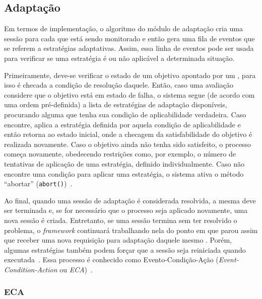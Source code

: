 \subsection{Adaptação}
\label{sec-referencial-zanshin-adaptacao}
Em termos de implementação, o algoritmo do módulo de adaptação cria uma sessão para cada \awreq que está sendo monitorado e então gera uma fila de eventos que se referem a estratégias adaptativas. Assim, essa linha de eventos pode ser usada para verificar se uma estratégia é ou não aplicável a determinada situação. 

Primeiramente, deve-se verificar o estado de um objetivo apontado por um \awreq, para isso é checada a condição de resolução daquele. Então, caso uma avaliação considere que o objetivo está em estado de falha, o sistema segue (de acordo com uma ordem pré-definida) a lista de estratégias de adaptação disponíveis, procurando alguma que tenha sua condição de aplicabilidade verdadeira. Caso encontre, aplica a estratégia definida por aquela condição de aplicabilidade e então retorna ao estado inicial, onde a checagem da satisfabilidade do objetivo é realizada novamente. Caso o objetivo ainda não tenha sido satisfeito, o processo começa novamente, obedecendo restrições como, por exemplo, o número de tentativas de aplicação de uma estratégia, definido individualmente. Caso não encontre uma condição para aplicar uma estratégia, o sistema ativa o método ``abortar'' (\texttt{abort()})~\cite{souza2013requirements}. 

Ao final, quando uma sessão de adaptação é considerada resolvida, a mesma deve ser terminada e, se for necessário que o processo seja aplicado novamente, uma nova sessão é criada. Entretanto, se uma sessão termina sem ter resolvido o problema, o \textit{framework} continuará trabalhando nela do ponto em que parou assim que receber uma nova requisição para adaptação daquele mesmo \awreq. Porém, algumas estratégias também podem forçar que a sessão seja reiniciada quando executada~\cite{souza2013requirements}. Essa processo é conhecido como Evento-Condição-Ação (\textit{Event-Condition-Action} ou \textit{ECA})~\cite{morin2009models}.

\subsubsection{ECA}
\label{sec-referencial-zanshin-eca}

